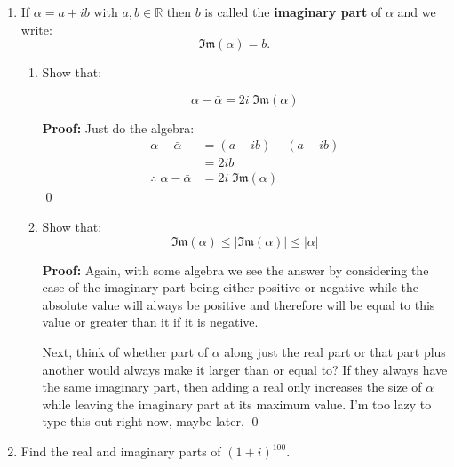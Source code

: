 \begin{enumerate}
	\textbf{Proof:}
	The value can be equal to the absolute value if it happens to be positive, in which case it coincides with the absolute value.

	Or, it can be the symmetric partner if it is negative and therefore equal in magnitude but opposite in direction, therefore ordered as $\le$ the absolute value by definition 
	of well-ordering in $\mathbb{R}$. Because the reals are symmetric like shoes, the have a left-handedness and a right-handedness. 
	\qed
	
	\item If $\alpha = a + ib$ with $a, b \in \mathbb{R}$ then $b$ is called the \textbf{imaginary part} of $\alpha$ and we write: 
	$$\mathfrak{Im}(\alpha) = b.$$

	\begin{enumerate}
		\item Show that: 

		$$\alpha - \bar{\alpha} = 2i \; \mathfrak{Im}(\alpha)$$

		\textbf{Proof:}
		Just do the algebra:
		\begin{align*}
			\alpha - \bar{\alpha} &= (a + ib) - (a - ib) \\
			&= 2ib \\
			\therefore \; \alpha - \bar{\alpha} &= 2i \; \mathfrak{Im}(\alpha)
		\end{align*}
		\qed


		\item Show that:
		$$\mathfrak{Im}(\alpha) \leq \left | \mathfrak{Im}(\alpha) \right | \leq |\alpha|$$

		\textbf{Proof:}
		Again, with some algebra we see the answer by considering the case of the imaginary part being either positive or negative while the absolute value will always be 
		positive and therefore will be equal to this value or greater than it if it is negative.

		Next, think of whether part of $\alpha$ along just the real part or that part plus another would always make it larger than or equal to? If they always have the 
		same imaginary part, then adding a real only increases the size of $\alpha$ while leaving the imaginary part at its maximum value. I'm too lazy to type this out right now, maybe later. 
		\qed
	\end{enumerate}
	
	\item Find the real and imaginary parts of $(1 + i)^{100}.$
	

\end{enumerate}
